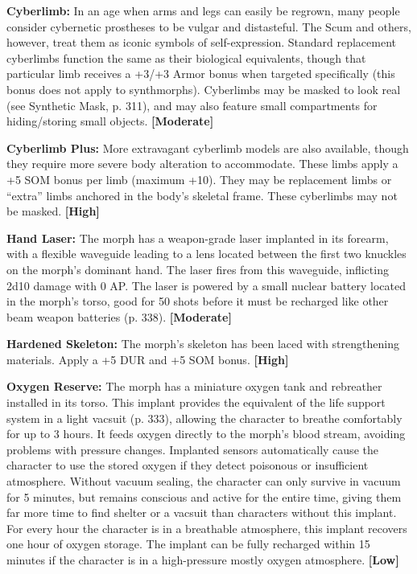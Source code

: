 \textbf{Cyberlimb:} In an age when arms and legs can easily be regrown, many people consider cybernetic prostheses to be vulgar and distasteful. The Scum and others, however, treat them as iconic symbols of self-expression. Standard replacement cyberlimbs function the same as their biological equivalents, though that particular limb receives a +3/+3 Armor bonus when targeted specifically (this bonus does not apply to synthmorphs). Cyberlimbs may be masked to look real (see Synthetic Mask, p. 311), and may also feature small compartments for hiding/storing small objects. \textbf{[Moderate]}

\textbf{Cyberlimb Plus:} More extravagant cyberlimb models are also available, though they require more severe body alteration to accommodate. These limbs apply a +5 SOM bonus per limb (maximum +10). They may be replacement limbs or ``extra'' limbs anchored in the body’s skeletal frame. These cyberlimbs may not be masked. \textbf{[High]}

\textbf{Hand Laser:} The morph has a weapon-grade laser implanted in its forearm, with a flexible waveguide leading to a lens located between the first two knuckles on the morph’s dominant hand. The laser fires from this waveguide, inflicting 2d10 damage with 0 AP. The laser is powered by a small nuclear battery located in the morph’s torso, good for 50 shots before it must be recharged like other beam weapon batteries (p. 338). \textbf{[Moderate]}

\textbf{Hardened Skeleton:} The morph’s skeleton has been laced with strengthening materials. Apply a +5 DUR and +5 SOM bonus. \textbf{[High]}

\textbf{Oxygen Reserve:} The morph has a miniature oxygen tank and rebreather installed in its torso. This implant provides the equivalent of the life support system in a light vacsuit (p. 333), allowing the character to breathe comfortably for up to 3 hours. It feeds oxygen directly to the morph’s blood stream, avoiding problems with pressure changes. Implanted sensors automatically cause the character to use the stored oxygen if they detect poisonous or insufficient atmosphere. Without vacuum sealing, the character can only survive in vacuum for 5 minutes, but remains conscious and active for the entire time, giving them far more time to find shelter or a vacsuit than characters without this implant. For every hour the character is in a breathable atmosphere, this implant recovers one hour of oxygen storage. The implant can be fully recharged within 15 minutes if the character is in a high-pressure mostly oxygen atmosphere. \textbf{[Low]}

